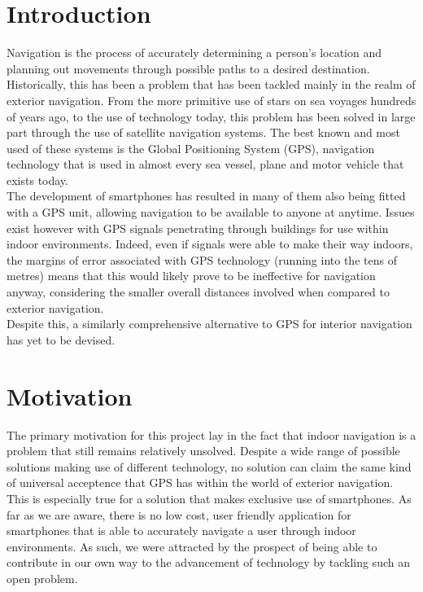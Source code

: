\documentclass[main.tex]{subfiles}
\begin{document}
\section{Introduction}

Navigation is the process of accurately determining a person's location and planning out movements through possible paths to a desired destination. Historically, this has been a problem that has been tackled mainly in the realm of exterior navigation. From the more primitive use of stars on sea voyages hundreds of years ago, to the use of technology today, this problem has been solved in large part through the use of satellite navigation systems. The best known and most used of these systems is the Global Positioning System (GPS), navigation technology that is used in almost every sea vessel, plane and motor vehicle that exists today.\\

The development of smartphones has resulted in many of them also being fitted with a GPS unit, allowing navigation to be available to anyone at anytime. Issues exist however with GPS signals penetrating through buildings for use within indoor environments. Indeed, even if signals were able to make their way indoors, the margins of error associated with GPS technology (running into the tens of metres) means that this would likely prove to be ineffective for navigation anyway, considering the smaller overall distances involved when compared to exterior navigation.\\

Despite this, a similarly comprehensive alternative to GPS for interior navigation has yet to be devised.\\

\section{Motivation}

The primary motivation for this project lay in the fact that indoor navigation is a problem that still remains relatively unsolved. Despite a wide range of possible solutions making use of different technology, no solution can claim the same kind of universal acceptence that GPS has within the world of exterior navigation. This is especially true for a solution that makes exclusive use of smartphones. As far as we are aware, there is no low cost, user friendly application for smartphones that is able to accurately navigate a user through indoor environments. As such, we were attracted by the prospect of being able to contribute in our own way to the advancement of technology by tackling such an open problem.\\
\end{document}
